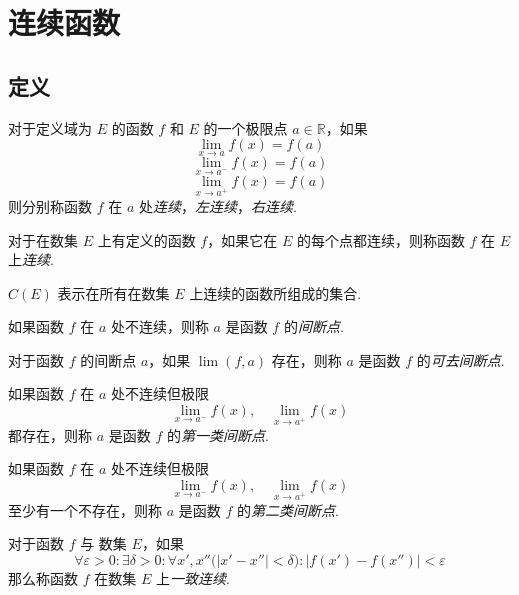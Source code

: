 \section{连续函数}
\subsection{定义}
\begin{definition}
    对于定义域为 $E$ 的函数 $f$ 和 $E$ 的一个极限点 $a \in \mathbb{R}$，如果
    \[\lim_{x \rightarrow a} f(x) = f(a)\]
    \[\lim_{x \rightarrow a^-} f(x) = f(a)\]
    \[\lim_{x \rightarrow a^+} f(x) = f(a)\]
    则分别称函数 $f$ 在 $a$ 处\emph{连续}，\emph{左连续}，\emph{右连续}.
\end{definition}\vspace{9pt}

\begin{definition}
    对于在数集 $E$ 上有定义的函数 $f$，如果它在 $E$ 的每个点都连续，则称函数 $f$ 在 $E$ 上\emph{连续}.
\end{definition}\vspace{9pt}

\begin{definition}
    $C(E)$ 表示在所有在数集 $E$ 上连续的函数所组成的集合.
\end{definition}\vspace{9pt}

\begin{definition}
    如果函数 $f$ 在 $a$ 处不连续，则称 $a$ 是函数 $f$ 的\emph{间断点}.

    对于函数 $f$ 的间断点 $a$，如果 $\lim(f,a)$ 存在，则称 $a$ 是函数 $f$ 的\emph{可去间断点}.
\end{definition}\vspace{9pt}

\begin{subdefinition}
    如果函数 $f$ 在 $a$ 处不连续但极限
    \[\lim_{x \rightarrow a^-} f(x),\quad \lim_{x \rightarrow a^+}f(x)\]
    都存在，则称 $a$ 是函数 $f$ 的\emph{第一类间断点}.
\end{subdefinition}

\begin{subdefinition}
    如果函数 $f$ 在 $a$ 处不连续但极限
    \[\lim_{x \rightarrow a^-}f(x), \quad \lim_{x \rightarrow a^+}f(x)\]
    至少有一个不存在，则称 $a$ 是函数 $f$ 的\emph{第二类间断点}.
\end{subdefinition}\vspace{9pt}

\begin{definition}
    对于函数 $f$ 与 数集 $E$，如果
    \[\forall \varepsilon > 0: \exists \delta > 0: \forall x', x'' \bigl(\lvert x' - x''\rvert < \delta\bigr): \lvert f(x') - f(x'')\rvert < \varepsilon\]
    那么称函数 $f$ 在数集 $E$ 上\emph{一致连续}.
\end{definition}

